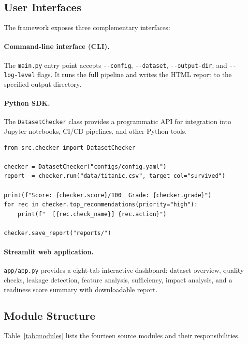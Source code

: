 \documentclass[12pt,a4paper]{report}
\begin{document}
\subsection{User Interfaces}

The framework exposes three complementary interfaces:

\paragraph{Command-line interface (CLI).}  The \texttt{main.py} entry point accepts
\verb|--config|, \verb|--dataset|, \verb|--output-dir|, and \verb|--log-level| flags.  It
runs the full pipeline and writes the HTML report to the specified output directory.

\paragraph{Python SDK.}  The \texttt{DatasetChecker} class provides a programmatic API
for integration into Jupyter notebooks, CI/CD pipelines, and other Python tools.

\begin{lstlisting}[caption={Python SDK usage example.}]
from src.checker import DatasetChecker

checker = DatasetChecker("configs/config.yaml")
report  = checker.run("data/titanic.csv", target_col="survived")

print(f"Score: {checker.score}/100  Grade: {checker.grade}")
for rec in checker.top_recommendations(priority="high"):
    print(f"  [{rec.check_name}] {rec.action}")

checker.save_report("reports/")
\end{lstlisting}

\paragraph{Streamlit web application.}  \texttt{app/app.py} provides a eight-tab interactive
dashboard: dataset overview, quality checks, leakage detection, feature analysis, sufficiency,
impact analysis, and a readiness score summary with downloadable report.

\subsection{Module Structure}

Table~\ref{tab:modules} lists the fourteen source modules and their responsibilities.
\end{document}
